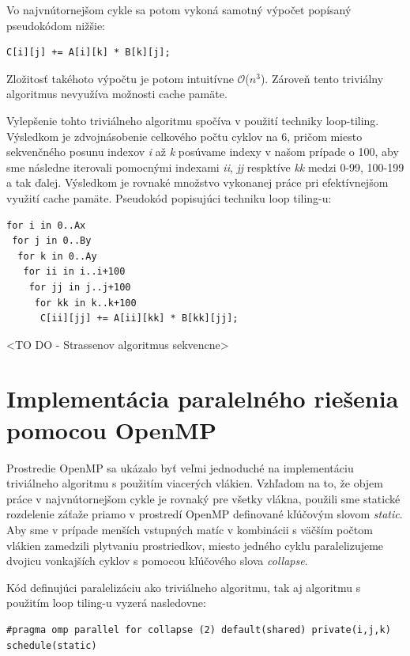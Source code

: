 \documentclass[slovak]{article}
\begin{document}
Vo najvnútornejšom cykle sa potom vykoná samotný výpočet popísaný pseudokódom nižšie:

\begin{verbatim}
C[i][j] += A[i][k] * B[k][j];
\end{verbatim}

Zložitosť takéhoto výpočtu je potom intuitívne $\mathcal{O}$($n^3$). Zároveň tento triviálny algoritmus nevyužíva možnosti cache pamäte.

Vylepšenie tohto triviálneho algoritmu spočíva v použití techniky loop-tiling. Výsledkom je zdvojnásobenie celkového počtu cyklov na 6, pričom miesto sekvenčného posunu indexov \emph{i} až \emph{k} posúvame indexy v našom prípade o 100, aby sme následne iterovali pomocnými indexami \emph{ii}, \emph{jj} respktíve \emph{kk} medzi 0-99, 100-199 a tak ďalej. Výsledkom je rovnaké množstvo vykonanej práce pri efektívnejšom využití cache pamäte. Pseudokód popisujúci techniku loop tiling-u:

\begin{verbatim}
for i in 0..Ax
 for j in 0..By
  for k in 0..Ay
   for ii in i..i+100 
    for jj in j..j+100
     for kk in k..k+100
      C[ii][jj] += A[ii][kk] * B[kk][jj];
\end{verbatim}

<TO DO - Strassenov algoritmus sekvencne>

\section{Implementácia paralelného riešenia pomocou OpenMP}

Prostredie OpenMP sa ukázalo byť veľmi jednoduché na implementáciu triviálneho algoritmu s použitím viacerých vlákien. Vzhľadom na to, že objem práce v najvnútornejšom cykle je rovnaký pre všetky vlákna, použili sme statické rozdelenie záťaže priamo v prostredí OpenMP definované kľúčovým slovom \emph{static}. Aby sme v prípade menších vstupných matíc v kombinácii s väčším počtom vlákien zamedzili plytvaniu prostriedkov, miesto jedného cyklu paralelizujeme dvojicu vonkajších cyklov s pomocou kľúčového slova \emph{collapse}.

Kód definujúci paralelizáciu ako triviálneho algoritmu, tak aj algoritmu s použitím loop tiling-u vyzerá nasledovne:

\begin{verbatim}
#pragma omp parallel for collapse (2) default(shared) private(i,j,k)
schedule(static)
\end{verbatim}
\end{document}
